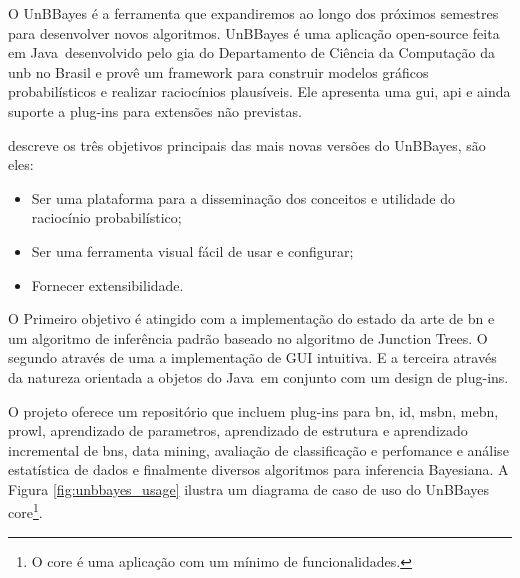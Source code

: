 O UnBBayes é a ferramenta que expandiremos ao longo dos próximos semestres para desenvolver novos algoritmos.
UnBBayes é uma aplicação open-source feita em Java\texttrademark\ desenvolvido pelo \gls{gia} do Departamento de Ciência da Computação da \gls{unb} no Brasil e provê um framework para construir modelos gráficos probabilísticos e realizar raciocínios plausíveis. Ele apresenta uma \gls{gui}, \gls{api} e ainda suporte a plug-ins para extensões não previstas.

\cite{javaApi11} descreve os três objetivos principais das mais novas versões do UnBBayes, são eles:
\begin{itemize}
	\item Ser uma plataforma para a disseminação dos conceitos e utilidade do raciocínio probabilístico;
	\item Ser uma ferramenta visual fácil de usar e configurar;
	\item Fornecer extensibilidade.
\end{itemize}
O Primeiro objetivo é atingido com a implementação do estado da arte de \gls{bn} e um algoritmo de inferência padrão baseado no algoritmo de Junction Trees. O segundo através de uma a implementação de GUI intuitiva. E a terceira através da natureza orientada a objetos do Java\texttrademark\ em conjunto com um design de plug-ins.

O projeto oferece um repositório que incluem plug-ins para \gls{bn}, \gls{id}, \gls{msbn}, \gls{mebn}, \gls{prowl}, aprendizado de parametros, aprendizado de estrutura e aprendizado incremental de \glspl{bn}, data mining, avaliação de classificação e perfomance e análise estatística de dados e finalmente diversos algoritmos para inferencia Bayesiana. A Figura \ref{fig:unbbayes_usage} ilustra um diagrama de caso de uso do UnBBayes core\footnote{O core é uma aplicação com um mínimo de funcionalidades.}.

